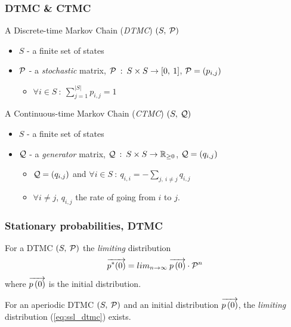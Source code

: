 \documentclass{beamer}
\begin{document}
\frame
{
	\frametitle{DTMC \& CTMC}
	\begin{definition}
		A Discrete-time Markov Chain (\emph{DTMC}) $\left( S,\: \mathcal{P} \right)$
		\begin{itemize}
			\item $S$ - a finite set of states
			\item $\mathcal{P}$ - a \emph{stochastic} matrix, $\mathcal{P} \: : \: S \times S \rightarrow \left[0,\:1 \right]$, $\mathcal{P}=\left(p_{i,j}\right)$
				{\small
				\begin{itemize}
					\item $\forall i \in S \: : \: \sum_{j=1}^{|S|} p_{i,j}=1$
				\end{itemize}
				}
		\end{itemize}
	\end{definition}
	\begin{definition}
		A Continuous-time Markov Chain (\emph{CTMC}) $\left( S,\: \mathcal{Q} \right)$
		\begin{itemize}
			\item $S$ - a finite set of states
			\item $\mathcal{Q}$ - a \emph{generator} matrix, $\mathcal{Q} \: : \: S \times S \rightarrow \mathbb{R}_{\geq 0}$, $\mathcal{Q}=\left(q_{i,j}\right)$
				{\small
				\begin{itemize}
					\item $\mathcal{Q}=\left(q_{i,j}\right)$ and $\forall i \in S \: : \: q_{i,i} = -\sum_{j, \: i \neq j} q_{i,j}$
					\item $\forall i \neq j$, $q_{i,j}$ the rate of going from $i$ to $j$.
				\end{itemize}
				}
		\end{itemize}
	\end{definition}
}

\frame
{
	\frametitle{Stationary probabilities, DTMC \cite{Haverkort_98}}
	\begin{definition}
		For a DTMC $\left( S,\: \mathcal{P} \right)$ the \emph{limiting} distribution
		\begin{equation}
			\overrightarrow{p^{*}(0)} = lim_{n \to \infty} \: \overrightarrow{p \left( 0 \right)} \cdot \mathcal{P}^{n}
			\label{eq:ssl_dtmc}
		\end{equation}
		where $\overrightarrow{p \left( 0 \right)}$ is the initial distribution.
	\end{definition}
	\begin{theorem}
		For an \alert{aperiodic} DTMC $\left( S,\: \mathcal{P} \right)$ and an initial distribution $\overrightarrow{p \left( 0 \right)}$, the \emph{limiting} distribution (\ref{eq:ssl_dtmc}) exists.
	\end{theorem}
}
\end{document}
